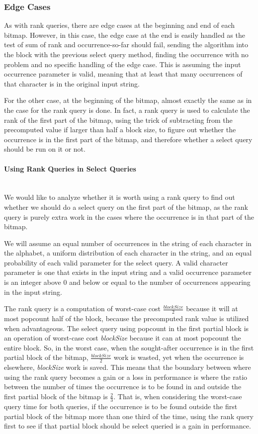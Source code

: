 \subsubsection{Edge Cases}
As with rank queries, there are edge cases at the beginning and end of each bitmap.
However, in this case, the edge case at the end is easily handled as the test of sum of rank and occurrence-so-far should fail, sending the algorithm into the block with the previous select query method, finding the occurrence with no problem and no specific handling of the edge case.
This is assuming the input occurrence parameter is valid, meaning that at least that many occurrences of that character is in the original input string.

For the other case, at the beginning of the bitmap, almost exactly the same as in the case for the rank query is done.
In fact, a rank query is used to calculate the rank of the first part of the bitmap, using the trick of subtracting from the precomputed value if larger than half a block size, to figure out whether the occurrence is in the first part of the bitmap, and therefore whether a select query should be run on it or not.

\paragraph{Using Rank Queries in Select Queries}~\\
We would like to analyze whether it is worth using a rank query to find out whether we should do a select query on the first part of the bitmap, as the rank query is purely extra work in the cases where the occurrence is in that part of the bitmap.

We will assume an equal number of occurrences in the string of each character in the alphabet, a uniform distribution of each character in the string, and an equal probability of each valid parameter for the select query.
A valid character parameter is one that exists in the input string and a valid occurrence parameter is an integer above 0 and below or equal to the number of occurrences appearing in the input string.

The rank query is a computation of worst-case cost $\frac{\mathit{blockSize}}{2}$ because it will at most popcount half of the block, because the precomputed rank value is utilized when advantageous.
The select query using popcount in the first partial block is an operation of worst-case cost \textit{blockSize} because it can at most popcount the entire block.
So, in the worst case, when the sought-after occurrence is in the first partial block of the bitmap, $\frac{\mathit{blockSize}}{2}$ work is wasted, yet when the occurrence is elsewhere, \textit{blockSize} work is saved.
This means that the boundary between where using the rank query becomes a gain or a loss in performance is where the ratio between the number of times the occurrence is to be found in and outside the first partial block of the bitmap is $\frac{2}{3}$.
That is, when considering the worst-case query time for both queries, if the occurrence is to be found outside the first partial block of the bitmap more than one third of the time, using the rank query first to see if that partial block should be select queried is a gain in performance.

